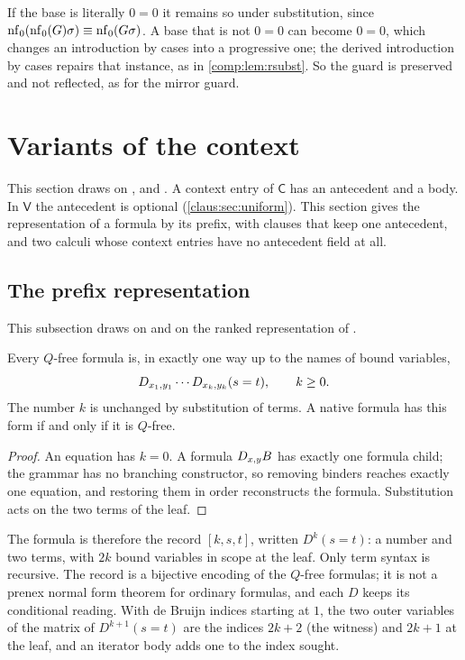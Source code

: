 If the base is literally $0=0$ it remains so under substitution, since
$\operatorname{nf}_0(\operatorname{nf}_0(G)\sigma)\equiv\operatorname{nf}_0(G\sigma)$. A base that is not $0=0$ can become
$0=0$, which changes an introduction by cases into a progressive one; the
derived introduction by cases repairs that instance, as in
\cref{comp:lem:rsubst}. So the guard is preserved and not reflected, as
for the mirror guard.

\section{Variants of the context}
\label{claus:sec:context}

This section draws on ,  and
. A context entry of $\mathsf{C}$ has an antecedent and a body. In
$\mathsf{V}$ the antecedent is optional (\cref{claus:sec:uniform}). This
section gives the representation of a formula by its prefix, with clauses
that keep one antecedent, and two calculi whose context entries have no
antecedent field at all.

\subsection{The prefix representation}
\label{claus:sec:prefix}

This subsection draws on  and on the ranked
representation of .

\begin{lemma}
\label{claus:lem:prefix}
Every $Q$-free formula is, in exactly one way up to the names of bound
variables,
\[
 D_{x_1,y_1}\cdots D_{x_k,y_k}(s=t),\qquad k\ge 0 .
\]
The number $k$ is unchanged by substitution of terms. A native formula has
this form if and only if it is $Q$-free.
\end{lemma}
\begin{proof}
An equation has $k=0$. A formula $D_{x,y}B$ has exactly one formula child;
the grammar has no branching constructor, so removing binders reaches
exactly one equation, and restoring them in order reconstructs the
formula. Substitution acts on the two terms of the leaf.
\end{proof}

The formula is therefore the record $[k,s,t]$, written $D^k(s=t)$: a
number and two terms, with $2k$ bound variables in scope at the leaf. Only
term syntax is recursive. The record is a bijective encoding of the
$Q$-free formulas; it is not a prenex normal form theorem for ordinary
formulas, and each $D$ keeps its conditional reading. With de Bruijn
indices starting at $1$, the two outer variables of the matrix of
$D^{k+1}(s=t)$ are the indices $2k+2$ (the witness) and $2k+1$ at the leaf,
and an iterator body adds one to the index sought.

